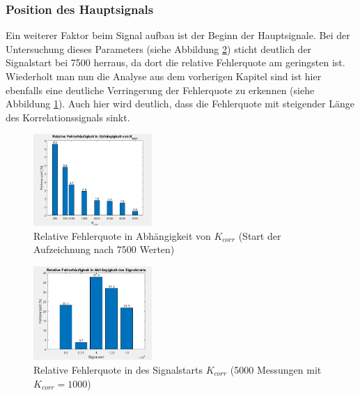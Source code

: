\subsubsection{Position des Hauptsignals}
Ein weiterer Faktor beim Signal aufbau ist der Beginn der Hauptsignale. Bei der Untersuchung dieses Parameters (siehe Abbildung \ref{fig:KorrelationAnalyse3}) sticht deutlich der Signalstart bei 7500 herraus, da dort die relative Fehlerquote am geringsten ist.
Wiederholt man nun die Analyse aus dem vorherigen Kapitel sind ist hier ebenfalls eine deutliche Verringerung der Fehlerquote zu erkennen (siehe Abbildung \ref{fig:KorrelationAnalyse4}). Auch hier wird deutlich, dass die Fehlerquote mit steigender Länge des Korrelationssignals sinkt.
\begin{figure}
\centering 
\includegraphics[width=0.4\textwidth]{KorrelationsAnalyse4}
\caption{Relative Fehlerquote in Abhängigkeit von $K_{corr}$  \linebreak(Start der Aufzeichnung nach 7500 Werten)} \label{fig:KorrelationAnalyse4}
\end{figure}

\begin{figure}
\centering 
\includegraphics[width=0.4\textwidth]{KorrelationsAnalyse3}
\caption{Relative Fehlerquote in des Signalstarts $K_{corr}$  \linebreak(5000 Messungen mit $K_{corr}=1000$)} \label{fig:KorrelationAnalyse3}
\end{figure}
